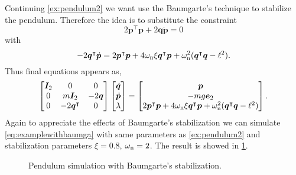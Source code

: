 		\begin{example}
			Continuing \cref{ex:pendulum2} we want use the Baumgarte's technique to stabilize the pendulum. Therefore the idea is to substitute the constraint
			\begin{equation*}
				2\bm{p}^{\intercal}\bm{p}+2\bm{q}\dot{\bm{p}} = 0
			\end{equation*}
			with
			\begin{equation*}
				-2\bm{q}^{\intercal}\dot{\bm{p}} = 2\bm{p}^{\intercal}\bm{p} + 4\omega_{\textnormal{n}}\xi\bm{q}^{\intercal}\bm{p} + \omega_{\textnormal{n}}^{2}(\bm{q}^{\intercal}\bm{q}-\ell^{2}).
			\end{equation*}
			Thus final equations appears as, 
			\begin{equation}
				\label{eq:examplewithbaumga}
				\begin{bmatrix}
					\bm{I}_{2} 	& 0 & 0 \\
					0 			& m\bm{I}_{2} & -2\bm{q} \\ 
					0 			& -2\bm{q}^{\intercal}  & 0
				\end{bmatrix}
				\begin{bmatrix}
					\dot{\bm{q}} \\
					\dot{\bm{p}} \\
					\lambda
				\end{bmatrix}
				= 
				\begin{bmatrix}
					\bm{p} \\
					-mg\bm{e}_{2}\\
					2\bm{p}^{\intercal}\bm{p} + 4\omega_{\textnormal{n}}\xi\bm{q}^{\intercal}\bm{p} + \omega_{\textnormal{n}}^{2}(\bm{q}^{\intercal}\bm{q}-\ell^{2})
				\end{bmatrix}.
			\end{equation}
			Again to appreciate the effects of Baumgarte's stabilization we can simulate \cref{eq:examplewithbaumga} with same parameters as \cref{ex:pendulum2} and stabilization parameters $\xi = 0.8$, $\omega_{\textnormal{n}} = 2$. The result is showed in \cref{fig:trackingerros}.
			\begin{figure}[htbp]
				\centering
				\caption{Pendulum simulation with Baumgarte's stabilization.}
				\label{fig:trackingerros}
			\end{figure}
		\end{example}

		